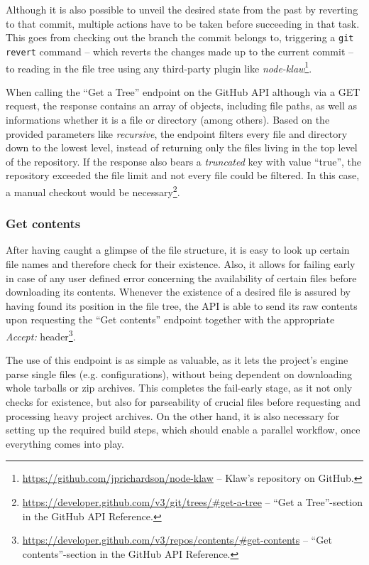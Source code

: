 Although it is also possible to unveil the desired state from the past by reverting to that commit, multiple actions have to be taken before succeeding in that task. This goes from checking out the branch the commit belongs to, triggering a \texttt{git revert} command -- which reverts the changes made up to the current commit \cite{GitRevert} -- to reading in the file tree using any third-party plugin like \emph{node-klaw}\footnote{\url{https://github.com/jprichardson/node-klaw} -- Klaw's repository on GitHub.}.

When calling the ``Get a Tree'' endpoint on the GitHub API although via a GET request, the response contains an array of objects, including file paths, as well as informations whether it is a file or directory (among others). Based on the provided parameters like \emph{recursive}, the endpoint filters every file and directory down to the lowest level, instead of returning only the files living in the top level of the repository. If the response also bears a \emph{truncated} key with value ``true'', the repository exceeded the file limit and not every file could be filtered. In this case, a manual checkout would be necessary\footnote{\url{https://developer.github.com/v3/git/trees/\#get-a-tree} -- ``Get a Tree''-section in the GitHub API Reference.}.

\subsubsection{Get contents}
After having caught a glimpse of the file structure, it is easy to look up certain file names and therefore check for their existence. Also, it allows for failing early in case of any user defined error concerning the availability of certain files before downloading its contents. Whenever the existence of a desired file is assured by having found its position in the file tree, the API is able to send its raw contents upon requesting the ``Get contents'' endpoint together with the appropriate \emph{Accept:} header\footnote{\url{https://developer.github.com/v3/repos/contents/\#get-contents} -- ``Get contents''-section in the GitHub API Reference.}.

The use of this endpoint is as simple as valuable, as it lets the project's engine parse single files (e.g. configurations), without being dependent on downloading whole tarballs or zip archives. This completes the fail-early stage, as it not only checks for existence, but also for parseability of crucial files before requesting and processing heavy project archives. On the other hand, it is also necessary for setting up the required build steps, which should enable a parallel workflow, once everything comes into play.

